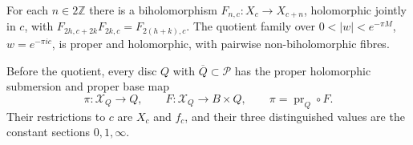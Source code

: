 \begin{proposition}\hypertarget{tag-01Q2}{}\label{fam:src:A.3.1}\label{fam:st:A.3.1}\label{I:coherent-descent-proof}

For each $n\in2\mathbb Z$ there is a biholomorphism $F_{n,c}:X_c\to X_{c+n}$, holomorphic jointly in $c$, with $F_{2h,c+2k}F_{2k,c}=F_{2(h+k),c}$. The quotient family over $0<|w|<e^{-\pi M}$, $w=e^{-\pi ic}$, is proper and holomorphic, with pairwise non-biholomorphic fibres.

Before the quotient, every disc $Q$ with $\overline Q\subset\mathcal P$
has the proper holomorphic submersion and proper base map
\begin{equation}
 \pi:\mathcal X_Q\longrightarrow Q,\qquad
 F:\mathcal X_Q\longrightarrow B\times Q,\qquad
 \pi=\operatorname{pr}_Q\circ F.
\label{pub:I:eq:PD2}
\end{equation}
Their restrictions to $c$ are $X_c$ and $f_c$, and their three
distinguished values are the constant sections $0,1,\infty$.
\end{proposition}
